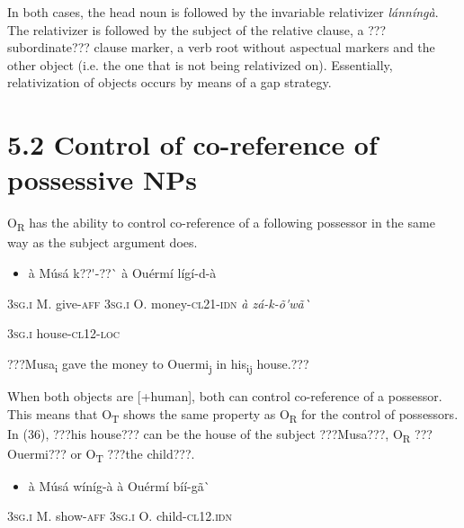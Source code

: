 \documentclass[output=paper]{langsci/langscibook}
\begin{document}
{{{{In both cases, the head noun is followed by the invariable relativizer \textit{l\'{a}nn\'{i}ng\`{a}}. The relativizer is followed by the subject of the relative clause, a ???subordinate??? clause marker, a verb root without aspectual markers and the other object (i.e. the one that is not being relativized on). Essentially, relativization of objects occurs by means of a gap strategy. 

\section{5.2 Control of co{}-reference of possessive NPs}

O\textsubscript{R} has the ability to control co-reference of a following possessor{ }in the same way as the subject argument does.

\begin{itemize}
\item \begin{styleNumberedEX}
\`{a}    M\'{u}s\'{a}  k??\'{ }-??\`{ }  \`{a}    Ou\'{e}rm\'{i}  l\'{i}g\'{i}-d-\`{a}    
\end{styleNumberedEX}\end{itemize}
\begin{styleGloss}
\textsc{3sg.i}  M.  give-\textsc{aff  3sg.i}    O.            money-\textsc{cl21-idn}    \textit{    }\textit{\`{a}    z\'{a}-k-\~{o}\'{ }w\~{a}\`{ }}  
\end{styleGloss}

\begin{styleGloss}
  \textsc{3sg.i  }  house-\textsc{cl12-loc}
\end{styleGloss}

\begin{styleTranslation}
???Musa\textsubscript{i} gave the money to Ouermi\textsubscript{j} in his\textsubscript{ij} house.???
\end{styleTranslation}

When both objects are [+human], both can control co-reference of a possessor. This means that O\textsubscript{T }shows the same property as O\textsubscript{R} for the control of possessors. In (36), ???his house??? can be the house of the subject ???Musa???, O\textsubscript{R} ???Ouermi??? or O\textsubscript{T} ???the child???.

\begin{itemize}
\item \begin{styleNumberedEX}
\label{bkm:Ref424318801}\`{a}    M\'{u}s\'{a}  w\'{i}n\'{i}g-\`{a}  \`{a}    Ou\'{e}rm\'{i}  b\'{i}\'{i}-g\~{a}\`{ }    
\end{styleNumberedEX}\end{itemize}
\begin{styleGloss}
\textsc{3sg.i  }  M.  show-\textsc{aff}  \textsc{3sg.i  }  O.    child\textsc{{}-cl12.idn}    
\end{styleGloss}

}}}}
\end{document}
